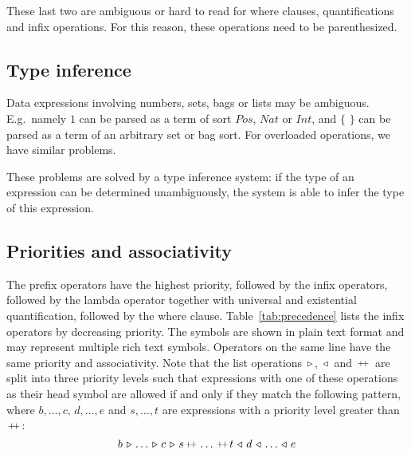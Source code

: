 \documentclass[a4paper,fleqn]{article}
\newcommand{\frm}[1]{\mbox{\ensuremath{#1}}}
\newcommand{\f}[1]{\ensuremath{\mathit{#1}}}
\newcommand{\set}[1]{\ensuremath{\{\,#1\,\}}}
\newcommand{\cons}{\ensuremath{\hspace{0.12em}\triangleright\hspace{0.08em}}}
\newcommand{\snoc}{\ensuremath{\hspace{0.08em}\triangleleft\hspace{0.12em}}}
\newcommand{\concat}{\ensuremath{\hspace{0.12em}\raisebox{0.2ex}
{\text{\scriptsize+}\!\text{\scriptsize+}}\hspace{0.12em}}}
\newcommand{\srtpos}{\f{Pos}}
\newcommand{\srtnat}{\f{Nat}}
\newcommand{\srtint}{\f{Int}}
\begin{document}
\noindent
These last two are ambiguous or hard to read for where clauses, quantifications
and infix operations. For this reason, these operations need to be
parenthesized.

\subsection{Type inference}

Data expressions involving numbers, sets, bags or lists may be ambiguous. E.g.\
namely \frm{1} can be parsed as a term of sort \frm{\srtpos}, \frm{\srtnat} or
\frm{\srtint}, and \frm{\set{}} can be parsed as a term of an arbitrary set or
bag sort. For overloaded operations, we have similar problems.

These problems are solved by a type inference system: if the type of an
expression can be determined unambiguously, the system is able to infer the
type of this expression.

\subsection{Priorities and associativity}

The prefix operators have the highest priority, followed by the infix
operators, followed by the lambda operator together with universal and
existential quantification, followed by the where clause.
Table~\ref{tab:precedence} lists the infix operators by decreasing priority.
The symbols are shown in plain text format and may represent multiple rich text
symbols. Operators on the same line have the same priority and associativity.
Note that the list operations \frm{\cons}, \frm{\snoc} and \frm{\concat} are
split into three priority levels such that expressions with one of these
operations as their head symbol are allowed if and only if they match the
following pattern, where \frm{b, \ldots, c}, \frm{d, \ldots, e} and \frm{s,
\ldots, t} are expressions with a priority level greater than \frm{\concat}:
\[
b \cons \dots \cons c \cons s \concat \dots \concat t \snoc d \snoc \dots
\snoc e
\]
 
\end{document}
